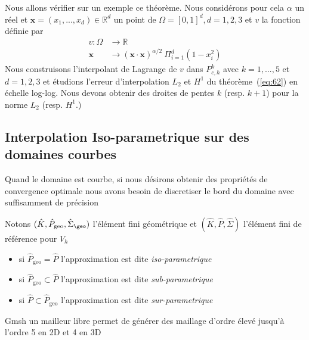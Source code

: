 \begin{example}
  Nous allons vérifier sur un exemple ce théorème. Nous considérons pour cela
  $\alpha$ un réel et $\mathbf{x}=(x_1,...,x_d) \in \mathbb{R}^d$ un point de $\Omega
  = [0,1]^d, d=1,2,3$ et $v$ la fonction définie par
  \begin{equation}
    \label{eq:97}
    \begin{split}
    v : \Omega &\rightarrow \mathbb{R}\\
    \mathbf{x} &\rightarrow ( \mathbf{x} \cdot \mathbf{x} )^{\alpha/2}\ \Pi_{i=1}^d(
    1-x_i^2)
    \end{split}
  \end{equation}
  Nous construisons l'interpolant de Lagrange de $v$ dans $P^k_{c,h}$ avec
  $k=1,...,5$ et $d=1,2,3$ et étudions l'erreur d'interpolation $L_2$ et $H^1$
  du  théorème~(\ref{eq:62})  en échelle log-log. Nous devons obtenir des
  droites de pentes $k$ (resp. $k+1$) pour la norme $L_2$ (resp. $H^1$.)

  
\end{example}

\subsection{Interpolation Iso-parametrique sur des domaines courbes}
\label{sec:interp-iso-param}

Quand le domaine est courbe, si nous désirons obtenir des propriétés de convergence optimale
nous avons besoin de discretiser le bord du domaine avec suffisamment  de précision

Notons $(\hat{K},\hat{P}_{\mathrm{geo}}, \hat{\Sigma}_{\geo})$ l'élément fini géométrique
et $(\hat{K},\hat{P}, \hat{\Sigma})$ l'élément fini de référence
pour $V_h$
\begin{definition}
  \label{def:38}
  \begin{itemize}
  \item si $\hat{P}_{\mathrm{geo}} = \hat{P}$ l'approximation est dite
    \emph{iso-parametrique}
  \item si $\hat{P}_{\mathrm{geo}} \subset \hat{P}$ l'approximation est dite
    \emph{sub-parametrique}
  \item si $\hat{P} \subset\hat{P}_{\mathrm{geo}}$ l'approximation est dite \emph{sur-parametrique}
  \end{itemize}
\end{definition}
\begin{remark}
  \label{rem:22}
  Gmsh un mailleur libre permet de générer des maillage d'ordre élevé jusqu'à
  l'ordre  5 en  2D et 4 en 3D
\end{remark}





